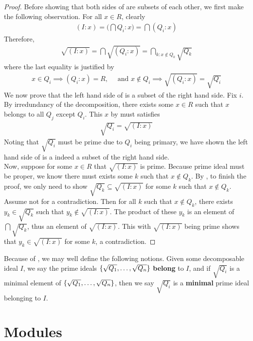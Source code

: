 \documentclass{report}
\begin{document}
\begin{proof}
Before showing that both sides of  are subsets of each other, we first make the following observation. For all $x \in R$, clearly 
\begin{align*}
  (I:x)= \Big(\bigcap Q_i :x\Big) = \bigcap (Q_i : x)
\end{align*}
Therefore, 
\begin{align}
\label{sIx}
\sqrt{(I:x)}= \bigcap \sqrt{(Q_i:x)}= \bigcap_{k:x \not\in Q_k} \sqrt{Q_k}  
\end{align}
where the last equality is justified by 
\begin{align*}
x \in Q_i \implies (Q_i:x)=R,\quad\text{ and } x \not\in Q_i \implies  \sqrt{(Q_i:x)} = \sqrt{Q_i} 
\end{align*}
We now prove that the left hand side of  is a subset of the right hand side. Fix $i$. By irredundancy of the decomposition, there exists some  $x\in R$ such that $x$ belongs to all $Q_j$ except  $Q_i$. This $x$ by  must satisfies
\begin{align*}
\sqrt{Q_i}  =  \sqrt{(I:x)} 
\end{align*}
Noting that $\sqrt{Q_i}$ must be prime due to $Q_i$ being primary, we have shown the left hand side of  is a indeed a subset of the right hand side. \\

Now, suppose for some $x\in R$ that $\sqrt{(I:x)}$ is prime. Because prime ideal must be proper, we know there must exists some $k$ such that $x\not \in Q_k$. By , to finish the proof, we only need to show $\sqrt{Q_k}\subseteq \sqrt{(I:x)}$ for some $k$ such that $x \not \in Q_k$. Assume not for a contradiction. Then for all $k$ such that $x \not \in Q_k$, there exists $y_k \in \sqrt{Q_k}$ such that $y_k \not \in \sqrt{(I:x)}$. The product of these $y_k$ is an element of  $\bigcap \sqrt{Q_k}$, thus an element of $\sqrt{(I:x)}$. This with $\sqrt{(I:x)}$ being prime shows that $y_k \in \sqrt{(I:x)}$ for some $k$, a contradiction. 
\end{proof}
Because of , we may well define the following notions. Given some decomposable ideal $I$, we say the prime ideals $\{ \sqrt{Q_1},\dots ,\sqrt{Q_n}  \}$ \textbf{belong} to $I$, and if $\sqrt{Q_i}$ is a minimal element of $\{ \sqrt{Q_1},\dots ,\sqrt{Q_n} \}$, then we say $\sqrt{Q_i}$ is a \textbf{minimal} prime ideal belonging to $I$.  
\chapter{Modules}
\end{document}
